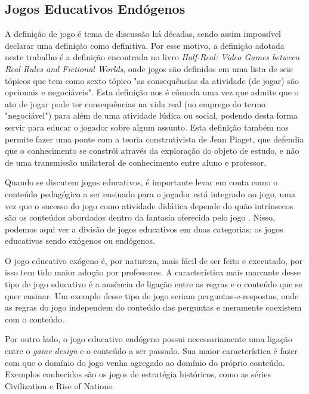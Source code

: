 \documentclass[conference]{IEEEtran}
\begin{document}
\subsection{Jogos Educativos Endógenos}
  
A definição de jogo é tema de discussão há décadas, sendo assim impossível declarar uma definição como definitiva. Por esse motivo, a definição adotada neste trabalho é a definição encontrada no livro \textit{Half-Real: Video Games between Real Rules and Fictional Worlds}, onde jogos são definidos em uma lista de seis tópicos que tem como sexto tópico "as consequências da atividade (de jogar) são opcionais e negociáveis"\cite{halfreal}. Esta definição nos é cômoda uma vez que admite que o ato de jogar pode ter consequências na vida real (no emprego do termo "negociável") para além de uma atividade lúdica ou social, podendo desta forma servir para educar o jogador sobre algum assunto. Esta definição também nos permite fazer uma ponte com a teoria construtivista de Jean Piaget, que defendia que o conhecimento se constrói através da exploração do objeto de estudo, e não de uma transmissão unilateral de conhecimento entre aluno e professor\cite{novaescola_piaget}. %
  
Quando se discutem jogos educativos, é importante levar em conta como o conteúdo pedagógico a ser ensinado para o jogador está integrado no jogo, uma vez que o sucesso do jogo como atividade didática depende do quão intrínsecos são os conteúdos abordados dentro da fantasia oferecida pelo jogo \cite{habgood_endogenous_2005}. Nisso, podemos aqui ver a divisão de jogos educativos em duas categorias: os jogos educativos sendo exógenos ou endógenos\cite{halverson_what_nodate}.

O jogo educativo exógeno é, por natureza, mais fácil de ser feito e executado, por isso tem tido maior adoção por professores.\cite{halverson_what_nodate} A característica mais marcante desse tipo de jogo educativo é a ausência de ligação entre as regras e o conteúdo que se quer ensinar.  Um exemplo desse tipo de jogo seriam perguntas-e-respostas, onde as regras do jogo independem do conteúdo das perguntas e meramente coexistem com o conteúdo.

Por outro lado, o jogo educativo endógeno possui necessariamente uma ligação entre o \textit{game design} e o conteúdo a ser passado. Sua maior característica é fazer com que o domínio do jogo venha agregado ao domínio do próprio conteúdo. Exemplos conhecidos são os jogos de estratégia históricos, como as séries Civilization e Rise of Nations\cite{halverson_what_nodate}.
\end{document}
